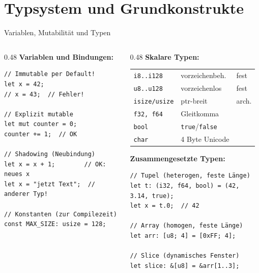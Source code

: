 \documentclass[%
  aspectratio=169,
  10pt
]{beamer}
\begin{document}
\section{Typsystem und Grundkonstrukte}

\begin{frame}[fragile]{Variablen, Mutabilität und Typen}
  \begin{columns}[T]
    \begin{column}{0.48\textwidth}
      \textbf{Variablen und Bindungen:}
\begin{lstlisting}
// Immutable per Default!
let x = 42;
// x = 43;  // Fehler!

// Explizit mutable
let mut counter = 0;
counter += 1;  // OK

// Shadowing (Neubindung)
let x = x + 1;        // OK: neues x
let x = "jetzt Text";  // anderer Typ!

// Konstanten (zur Compilezeit)
const MAX_SIZE: usize = 128;
\end{lstlisting}
    \end{column}
    \begin{column}{0.48\textwidth}
      \textbf{Skalare Typen:}
      \begin{block}{}
        \scriptsize
        \begin{tabular}{l l l}
          \texttt{i8..i128}  & vorzeichenbeh. & fest\\
          \texttt{u8..u128}  & vorzeichenlos  & fest\\
          \texttt{isize/usize} & ptr-breit    & arch.\\
          \texttt{f32, f64}  & Gleitkomma     &\\
          \texttt{bool}      & \texttt{true}/\texttt{false} &\\
          \texttt{char}      & 4 Byte Unicode &
        \end{tabular}
      \end{block}
      \textbf{Zusammengesetzte Typen:}
\begin{lstlisting}
// Tupel (heterogen, feste Länge)
let t: (i32, f64, bool) = (42, 3.14, true);
let x = t.0;  // 42

// Array (homogen, feste Länge)
let arr: [u8; 4] = [0xFF; 4];

// Slice (dynamisches Fenster)
let slice: &[u8] = &arr[1..3];
\end{lstlisting}
    \end{column}
  \end{columns}
\end{frame}
\end{document}
